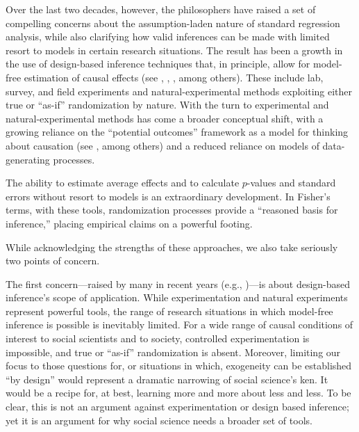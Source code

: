 \documentclass[12pt,]{book}
\begin{document}
Over the last two decades, however, the philosophers have raised a set of compelling concerns about the assumption-laden nature of standard regression analysis, while also clarifying how valid inferences can be made with limited resort to models in certain research situations. The result has been a growth in the use of design-based inference techniques that, in principle, allow for model-free estimation of causal effects (see \citet{dunning2012natural}, \citet{GerGreKap04}, \citet{druckman2011experimentation}, \citet{palfrey2009laboratory} among others). These include lab, survey, and field experiments and natural-experimental methods exploiting either true or ``as-if'' randomization by nature. With the turn to experimental and natural-experimental methods has come a broader conceptual shift, with a growing reliance on the ``potential outcomes'' framework as a model for thinking about causation (see \citet{Rubin1974}, \citet{splawa1990application} among others) and a reduced reliance on models of data-generating processes.

The ability to estimate average effects and to calculate \(p\)-values and standard errors without resort to models is an extraordinary development. In Fisher's terms, with these tools, randomization processes provide a ``reasoned basis for inference,'' placing empirical claims on a powerful footing.

While acknowledging the strengths of these approaches, we also take seriously two points of concern.

The first concern---raised by many in recent years (e.g., \citet{thelen2015comparative})---is about design-based inference's scope of application. While experimentation and natural experiments represent powerful tools, the range of research situations in which model-free inference is possible is inevitably limited. For a wide range of causal conditions of interest to social scientists and to society, controlled experimentation is impossible, and true or ``as-if'' randomization is absent. Moreover, limiting our focus to those questions for, or situations in which, exogeneity can be established ``by design'' would represent a dramatic narrowing of social science's ken. It would be a recipe for, at best, learning more and more about less and less. To be clear, this is not an argument against experimentation or design based inference; yet it is an argument for why social science needs a broader set of tools.
\end{document}

